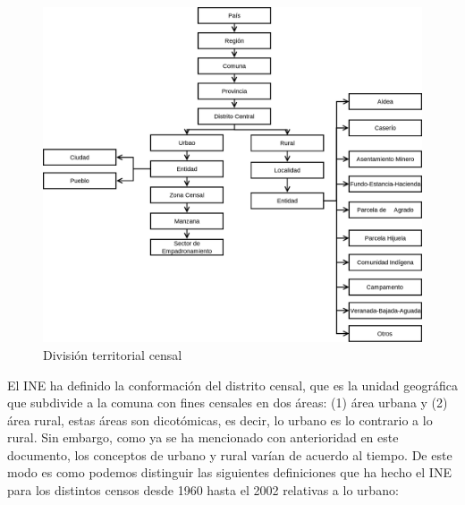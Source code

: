 \begin{figure}
  \centering
  \caption{División territorial censal}
  \label{censo}
  \includegraphics[scale=0.25]{censo}
\end{figure}

El INE ha definido la conformación del distrito censal, que es la unidad
geográfica que subdivide a la comuna con fines censales en dos áreas: (1) área urbana y (2) área
rural, estas áreas son dicotómicas, es decir, lo urbano es lo contrario a lo rural. Sin embargo,
como ya se ha mencionado con anterioridad en este documento, los conceptos de urbano y rural varían
de acuerdo al tiempo. De este modo es como podemos distinguir las siguientes definiciones que ha
hecho el INE para los distintos censos desde 1960 hasta el 2002 relativas a lo urbano:

